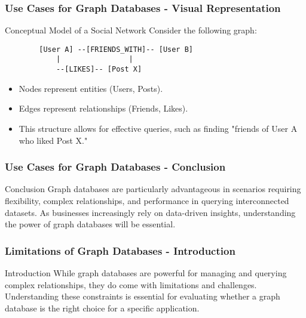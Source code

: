 \documentclass[aspectratio=169]{beamer}
\begin{document}
\begin{frame}[fragile]
    \frametitle{Use Cases for Graph Databases - Visual Representation}
    \begin{block}{Conceptual Model of a Social Network}
    Consider the following graph:
    \begin{lstlisting}
        [User A] --[FRIENDS_WITH]-- [User B]
            |                |      
            --[LIKES]-- [Post X]  
    \end{lstlisting}
    \end{block}
    \begin{itemize}
        \item Nodes represent entities (Users, Posts).
        \item Edges represent relationships (Friends, Likes).
        \item This structure allows for effective queries, such as finding "friends of User A who liked Post X."
    \end{itemize}
\end{frame}

\begin{frame}[fragile]
    \frametitle{Use Cases for Graph Databases - Conclusion}
    \begin{block}{Conclusion}
        Graph databases are particularly advantageous in scenarios requiring flexibility, complex relationships, and performance in querying interconnected datasets. As businesses increasingly rely on data-driven insights, understanding the power of graph databases will be essential.
    \end{block}
\end{frame}

\begin{frame}[fragile]
    \frametitle{Limitations of Graph Databases - Introduction}
    \begin{block}{Introduction}
        While graph databases are powerful for managing and querying complex relationships, they do come with limitations and challenges. Understanding these constraints is essential for evaluating whether a graph database is the right choice for a specific application.
    \end{block}
\end{frame}
\end{document}
